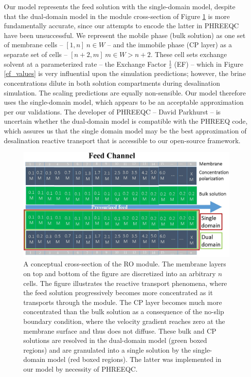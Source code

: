 \begin{supplementary}
Our model represents the feed solution with the single-domain model, despite that the dual-domain model in the module cross-section of Figure \ref{single_dual_domain} is more fundamentally accurate, since our attempts to encode the latter in PHREEQC have been unsuccessful. We represent the mobile phase (bulk solution) as one set of membrane cells -- $[1,n]~n\in W$ -- and the immobile phase (CP layer) as a separate set of cells -- $[n+2,m]~m \in W>n+2$. These cell sets exchange solvent at a parameterized rate -- the Exchange Factor $\frac{1}{s}$ (EF) -- which in Figure \ref{ef_values} is very influential upon the simulation predictions; however, the brine concentrations dilute in both solution compartments during desalination simulation. The scaling predictions are equally non-sensible. Our model therefore uses the single-domain model, which appears to be an acceptable approximation per our validations. The developer of PHREEQC -- David Parkhurst -- is uncertain whether the dual-domain model is compatible with the PHREEQ code, which assures us that the single domain model may be the best approximation of desalination reactive transport that is accessible to our open-source framework.

\begin{figure}
    \centering
    \includegraphics[width = \textwidth]{images/ROSSpy/supporting_information/single_dual_domain.jpg}
    \caption{
        A conceptual cross-section of the RO module. The membrane layers on top and bottom of the figure are discretized into an arbitrary $n$ cells. The figure illustrates the reactive transport phenomena, where the feed solution progressively becomes more concentrated as it transports through the module. The CP layer becomes much more concentrated than the bulk solution as a consequence of the no-slip boundary condition, where the velocity gradient reaches zero at the membrane surface and thus does not diffuse. These bulk and CP solutions are resolved in the dual-domain model (green boxed regions) and are granulated into a single solution by the single-domain model (red boxed regions). The latter was implemented in our model by necessity of PHREEQC.
    }
    \label{single_dual_domain}
\end{figure}


\end{supplementary}
